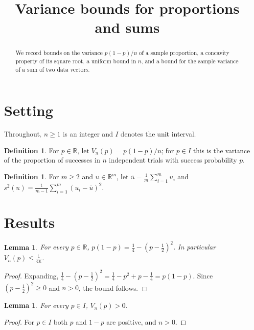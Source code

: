 \documentclass[11pt]{article}
\title{Variance bounds for proportions and sums}
\author{}
\date{}
\newtheorem{lemma}[theorem]{Lemma}
\theoremstyle{definition}
\newtheorem{definition}[theorem]{Definition}
\begin{document}
\maketitle

\begin{abstract}
We record bounds on the variance $p(1-p)/n$ of a sample proportion, a concavity property of its square root, a
uniform bound in $n$, and a bound for the sample variance of a sum of two data vectors.
\end{abstract}

\section{Setting}

Throughout, $n \ge 1$ is an integer and $I$ denotes the unit interval.

\begin{definition}\label{def:vp}
For $p \in \mathbb{R}$, let $V_n(p) = p(1-p)/n$; for $p \in I$ this is the variance of the proportion of successes
in $n$ independent trials with success probability $p$.
\end{definition}

\begin{definition}\label{def:svar}
For $m \ge 2$ and $u \in \mathbb{R}^m$, let $\bar u = \frac1m \sum_{i=1}^m u_i$ and
$s^2(u) = \frac{1}{m-1} \sum_{i=1}^m (u_i - \bar u)^2$.
\end{definition}

\section{Results}

\begin{lemma}\label{lem:quarter}
For every $p \in \mathbb{R}$, $p(1-p) = \frac14 - (p - \frac12)^2$. In particular $V_n(p) \le \frac{1}{4n}$.
\end{lemma}

\begin{proof}
Expanding, $\frac14 - (p - \frac12)^2 = \frac14 - p^2 + p - \frac14 = p(1-p)$. Since $(p - \frac12)^2 \ge 0$ and
$n > 0$, the bound follows.
\end{proof}

\begin{lemma}\label{lem:positive}
For every $p \in I$, $V_n(p) > 0$.
\end{lemma}

\begin{proof}
For $p \in I$ both $p$ and $1 - p$ are positive, and $n > 0$.
\end{proof}
\end{document}
